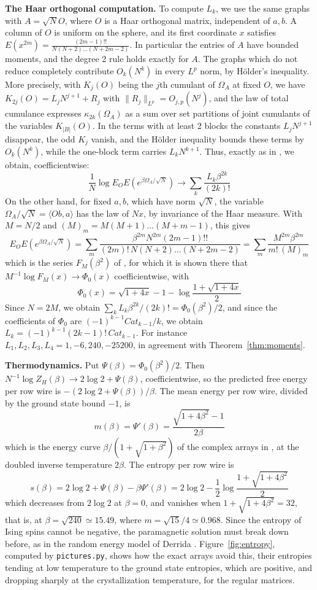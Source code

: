 \documentclass[11pt,a4paper]{article}
\theoremstyle{remark}
\begin{document}
\noindent\textbf{The Haar orthogonal computation.}
To compute $L_k$, we use the same graphs with $A=\sqrt NO$, where $O$ is a Haar orthogonal matrix, independent of $a,b$. A column of $O$ is uniform on the sphere, and its first coordinate $x$ satisfies $E(x^{2m})=\frac{(2m-1)!!}{N(N+2)\ldots(N+2m-2)}$. In particular the entries of $A$ have bounded moments, and the degree 2 rule holds exactly for $A$. The graphs which do not reduce completely contribute $O_k(N^k)$ in every $L^p$ norm, by H\"older's inequality. More precisely, with $K_j(O)$ being the $j$th cumulant of $\Omega_A$ at fixed $O$, we have $K_{2j}(O)=L_jN^{j+1}+R_j$ with $\|R_j\|_{L^p}=O_{j,p}(N^j)$, and the law of total cumulance expresses $\kappa_{2k}(\Omega_A)$ as a sum over set partitions of joint cumulants of the variables $K_{|B|}(O)$. In the terms with at least 2 blocks the constants $L_jN^{j+1}$ disappear, the odd $K_j$ vanish, and the H\"older inequality bounds these terms by $O_k(N^k)$, while the one-block term carries $L_kN^{k+1}$. Thus, exactly as in \cite{cot}, we obtain, coefficientwise:
\[
 \frac{1}{N}\log E_OE\left(e^{\beta\Omega_A/\sqrt N}\right)\to\sum_k\frac{L_k\beta^{2k}}{(2k)!}
\]
On the other hand, for fixed $a,b$, which have norm $\sqrt N$, the variable $\Omega_A/\sqrt N=\langle Ob,a\rangle$ has the law of $Nx$, by invariance of the Haar measure. With $M=N/2$ and $(M)_m=M(M+1)\ldots(M+m-1)$, this gives
\[
 E_OE\left(e^{\beta\Omega_A/\sqrt N}\right)=\sum_m\frac{\beta^{2m}N^{2m}(2m-1)!!}{(2m)!\,N(N+2)\ldots(N+2m-2)}=\sum_m\frac{M^{2m}\beta^{2m}}{m!\,(M)_m}
\]
which is the series $F_M(\beta^2)$ of \cite{cot}, for which it is shown there that $M^{-1}\log F_M(x)\to\Phi_0(x)$ coefficientwise, with
\[
 \Phi_0(x)=\sqrt{1+4x}-1-\log\frac{1+\sqrt{1+4x}}{2}
\]
Since $N=2M$, we obtain $\sum_kL_k\beta^{2k}/(2k)!=\Phi_0(\beta^2)/2$, and since the coefficients of $\Phi_0$ are $(-1)^{k-1}Cat_{k-1}/k$, we obtain $L_k=(-1)^{k-1}(2k-1)!\,Cat_{k-1}$. For instance $L_1,L_2,L_3,L_4=1,-6,240,-25200$, in agreement with Theorem~\ref{thm:moments}.

\medskip

\noindent\textbf{Thermodynamics.}
Put $\Psi(\beta)=\Phi_0(\beta^2)/2$. Then $N^{-1}\log Z_H(\beta)\to2\log2+\Psi(\beta)$, coefficientwise, so the predicted free energy per row wire is $-(2\log2+\Psi(\beta))/\beta$. The mean energy per row wire, divided by the ground state bound $-1$, is
\[
 m(\beta)=\Psi'(\beta)=\frac{\sqrt{1+4\beta^2}-1}{2\beta}
\]
which is the energy curve $\beta/(1+\sqrt{1+\beta^2})$ of the complex arrays in \cite{cot}, at the doubled inverse temperature $2\beta$. The entropy per row wire is
\[
 s(\beta)=2\log2+\Psi(\beta)-\beta\Psi'(\beta)=2\log2-\frac{1}{2}\log\frac{1+\sqrt{1+4\beta^2}}{2}
\]
which decreases from $2\log2$ at $\beta=0$, and vanishes when $1+\sqrt{1+4\beta^2}=32$, that is, at $\beta=\sqrt{240}\simeq15.49$, where $m=\sqrt{15}/4\simeq0.968$. Since the entropy of Ising spins cannot be negative, the paramagnetic solution must break down before, as in the random energy model of Derrida \cite{der}. Figure~\ref{fig:entropy}, computed by \texttt{pictures.py}, shows how the exact arrays avoid this, their entropies tending at low temperature to the ground state entropies, which are positive, and dropping sharply at the crystallization temperature, for the regular matrices.
\end{document}
